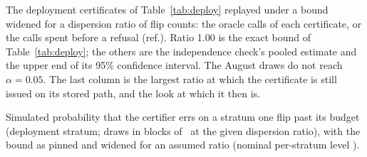 \begin{table}[t]
\caption{The deployment certificates of Table~\ref{tab:deploy} replayed
under a bound widened for a dispersion ratio of flip counts: the oracle
calls of each certificate, or the calls spent before a refusal (ref.). Ratio
1.00 is the exact bound of Table~\ref{tab:deploy}; the others are the
independence check's pooled estimate and the upper end of its 95\%
confidence interval. The August draws do not reach $\alpha{=}0.05$. The
last column is the largest ratio at which the certificate is still
issued on its stored path, and the look at which it then is.}
\label{tab:widen}
\centering\footnotesize
\setlength{\tabcolsep}{3pt}

\end{table}

\begin{table}[t]
\caption{Simulated probability that the certifier errs on a stratum one
flip past its budget (deployment stratum; draws in blocks of
\indepBlockSize\ at the given dispersion ratio), with the bound as
pinned and widened for an assumed ratio (nominal per-stratum level
\calNominalDelta).}
\label{tab:widensim}
\centering\footnotesize
\setlength{\tabcolsep}{3pt}

\end{table}
